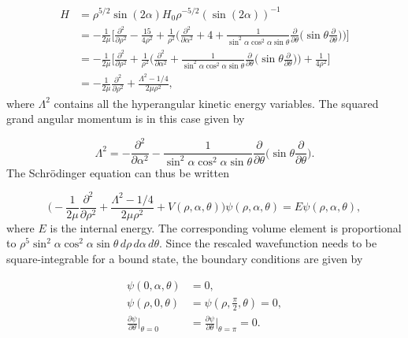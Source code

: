 \begin{align}
H&= \rho^{5/2}\sin(2\alpha) H_0 \rho^{-5/2}(\sin(2\alpha))^{-1}\nonumber\\
&= -\frac{1}{2\mu} \bigg[ \frac{\partial^2}{\partial\rho^2} - \frac{15}{4\rho^2} + \frac{1}{\rho^2}\bigg( \frac{\partial^2}{\partial\alpha^2} + 4 + \frac{1}{\sin^2\alpha\cos^2\alpha\sin\theta} \frac{\partial}{\partial\theta} \bigg( \sin\theta \frac{\partial}{\partial\theta} \bigg) \bigg) \bigg]\nonumber\\
&= -\frac{1}{2\mu} \bigg[ \frac{\partial^2}{\partial\rho^2} + \frac{1}{\rho^2}\bigg( \frac{\partial^2}{\partial\alpha^2} + \frac{1}{\sin^2\alpha\cos^2\alpha\sin\theta} \frac{\partial}{\partial\theta} \bigg( \sin\theta \frac{\partial}{\partial\theta} \bigg) \bigg) + \frac{1}{4\rho^2} \bigg]\nonumber\\
&= -\frac{1}{2\mu}\frac{\partial^2}{\partial\rho^2} + \frac{\Lambda^2 - 1/4}{2\mu\rho^2},
\end{align}   
where $\Lambda^2$ contains all the hyperangular kinetic energy variables. The squared grand angular momentum is in this case given by 

\begin{equation}
\Lambda^2 = -\frac{\partial^2}{\partial\alpha^2} - \frac{1}{\sin^2\alpha\cos^2\alpha\sin\theta} \frac{\partial}{\partial\theta} \bigg( \sin\theta \frac{\partial}{\partial\theta}\bigg).
\end{equation}
The Schr{\"o}dinger equation can thus be written

\begin{equation}
\bigg(-\frac{1}{2\mu}\frac{\partial^2}{\partial\rho^2} + \frac{\Lambda^2 - 1/4}{2\mu\rho^2} + V(\rho,\alpha,\theta)\bigg) \psi(\rho,\alpha,\theta) = E \psi(\rho,\alpha,\theta),
\end{equation}
where $E$ is the internal energy. The corresponding volume element is proportional to $\rho^5\sin^2\alpha\cos^2\alpha\sin\theta\, d\rho\, d\alpha\, d\theta$. Since the rescaled wavefunction needs to be square-integrable for a bound state, the boundary conditions are given by

\begin{align}
	\psi(0,\alpha,\theta) &= 0,\\
	\psi(\rho,0,\theta)    &= \psi(\rho,\frac{\pi}{2},\theta) = 0,\\
	\frac{\partial\psi}{\partial\theta}\bigg\rvert_{\theta = 0} &= \frac{\partial\psi}{\partial\theta}\bigg\rvert_{\theta = \pi} = 0.
\end{align}

